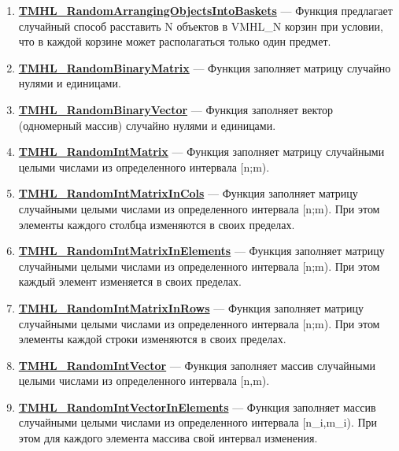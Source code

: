 \documentclass[a4paper,12pt]{article}
\begin{document}
\begin{enumerate}
\item \textbf{\hyperref[TMHL_RandomArrangingObjectsIntoBaskets]{TMHL\_RandomArrangingObjectsIntoBaskets}} --- Функция предлагает случайный способ расставить N объектов в VMHL\_N корзин при условии, что в каждой корзине может располагаться только один предмет.

\item \textbf{\hyperref[TMHL_RandomBinaryMatrix]{TMHL\_RandomBinaryMatrix}} --- Функция заполняет матрицу случайно нулями и единицами.

\item \textbf{\hyperref[TMHL_RandomBinaryVector]{TMHL\_RandomBinaryVector}} --- Функция заполняет вектор (одномерный массив) случайно нулями и единицами.

\item \textbf{\hyperref[TMHL_RandomIntMatrix]{TMHL\_RandomIntMatrix}} --- Функция заполняет матрицу случайными целыми числами из определенного интервала [n;m).

\item \textbf{\hyperref[TMHL_RandomIntMatrixInCols]{TMHL\_RandomIntMatrixInCols}} --- Функция заполняет матрицу случайными целыми числами из определенного интервала [n;m). При этом элементы каждого столбца изменяются в своих пределах.

\item \textbf{\hyperref[TMHL_RandomIntMatrixInElements]{TMHL\_RandomIntMatrixInElements}} --- Функция заполняет матрицу случайными целыми числами из определенного интервала [n;m). При этом каждый элемент изменяется в своих пределах.

\item \textbf{\hyperref[TMHL_RandomIntMatrixInRows]{TMHL\_RandomIntMatrixInRows}} --- Функция заполняет матрицу случайными целыми числами из определенного интервала [n;m). При этом элементы каждой строки изменяются в своих пределах.

\item \textbf{\hyperref[TMHL_RandomIntVector]{TMHL\_RandomIntVector}} --- Функция заполняет массив случайными целыми числами из определенного интервала [n,m).

\item \textbf{\hyperref[TMHL_RandomIntVectorInElements]{TMHL\_RandomIntVectorInElements}} --- Функция заполняет массив случайными целыми  числами из определенного интервала [n\_i,m\_i). При этом для каждого элемента массива свой интервал изменения.

\end{enumerate}
\end{document}
